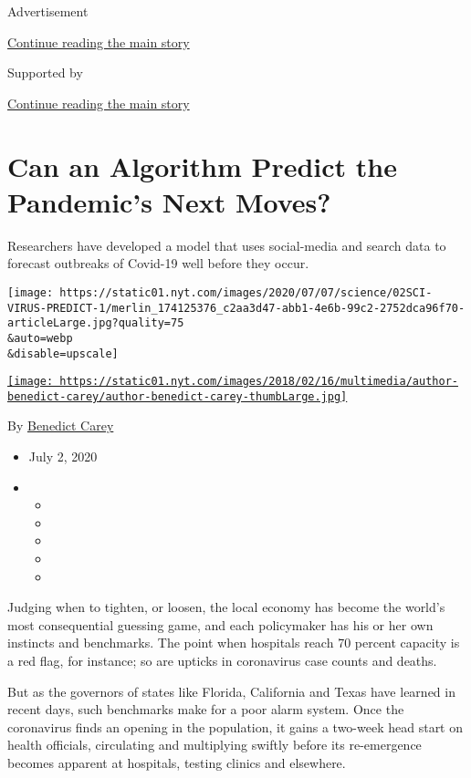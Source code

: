 Advertisement

\protect\hyperlink{after-top}{Continue reading the main story}

Supported by

\protect\hyperlink{after-sponsor}{Continue reading the main story}

\hypertarget{can-an-algorithm-predict-the-pandemics-next-moves}{%
\section{Can an Algorithm Predict the Pandemic's Next
Moves?}\label{can-an-algorithm-predict-the-pandemics-next-moves}}

Researchers have developed a model that uses social-media and search
data to forecast outbreaks of Covid-19 well before they occur.

\texttt{[image: https://static01.nyt.com/images/2020/07/07/science/02SCI-VIRUS-PREDICT-1/merlin\_174125376\_c2aa3d47-abb1-4e6b-99c2-2752dca96f70-articleLarge.jpg?quality=75\\\&auto=webp\\\&disable=upscale]}

\href{https://www.nytimes.com/by/benedict-carey}{\texttt{[image: https://static01.nyt.com/images/2018/02/16/multimedia/author-benedict-carey/author-benedict-carey-thumbLarge.jpg]}}

By \href{https://www.nytimes.com/by/benedict-carey}{Benedict Carey}

\begin{itemize}
\item
  July 2, 2020
\item
  \begin{itemize}
  \item
  \item
  \item
  \item
  \item
  \end{itemize}
\end{itemize}

Judging when to tighten, or loosen, the local economy has become the
world's most consequential guessing game, and each policymaker has his
or her own instincts and benchmarks. The point when hospitals reach 70
percent capacity is a red flag, for instance; so are upticks in
coronavirus case counts and deaths.

But as the governors of states like Florida, California and Texas have
learned in recent days, such benchmarks make for a poor alarm system.
Once the coronavirus finds an opening in the population, it gains a
two-week head start on health officials, circulating and multiplying
swiftly before its re-emergence becomes apparent at hospitals, testing
clinics and elsewhere.

